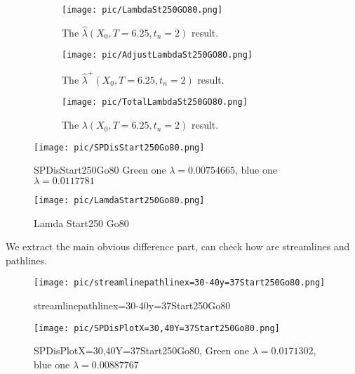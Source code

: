 \documentclass[
     11pt,         %
     a4paper,      %
     oneside,
     ]{article}
\begin{document}
\begin{figure}[H]
	\centering
	\begin{subfigure}{0.3\textwidth}
		\centering
		\texttt{[image: pic/LambdaSt250GO80.png]}
		\caption{The $\hat{\lambda}(X_{0}, T=6.25, t_{n}=2)$ result.}
	\end{subfigure}
	\begin{subfigure}{0.3\textwidth}
		\centering
		\texttt{[image: pic/AdjustLambdaSt250GO80.png]}
		\caption{ The $\hat{\lambda}^{+}(X_{0}, T=6.25, t_{n}=2)$ result.}
	\end{subfigure}
	\begin{subfigure}{0.3\textwidth}
		\centering
		\texttt{[image: pic/TotalLambdaSt250GO80.png]}
		\caption{ The $\lambda(X_{0}, T=6.25, t_{n}=2)$ result.}
	\end{subfigure}
	
	\caption{}
	\label{fig:lamadaResult2s}
\end{figure}

\begin{figure}[H]
	\centering
	\begin{minipage}{0.45\textwidth}
		\centering
		\texttt{[image: pic/SPDisStart250Go80.png]}
		\caption{{\tiny SPDisStart250Go80 Green one $\lambda=0.00754665$, blue one $\lambda=0.0117781$}}
		\label{fig:SPDisStart250Go80}
	\end{minipage}
	\begin{minipage}{0.45\textwidth}
		\centering
		\texttt{[image: pic/LamdaStart250Go80.png]}
		\caption{{\tiny Lamda Start250 Go80}}
		\label{fig:LamdaStart250Go80}
	\end{minipage}
	
\end{figure}

We extract the main obvious difference part, can check how are streamlines and pathlines. 



\begin{figure}[H]
	\centering
	\begin{minipage}{0.45\textwidth}
		\centering
		\texttt{[image: pic/streamlinepathlinex=30-40y=37Start250Go80.png]}
		\caption{\tiny streamlinepathlinex=30-40y=37Start250Go80 }
		\label{fig:streamlinepathlinex=30-40y=37Start250Go80}
	\end{minipage}
	\begin{minipage}{0.45\textwidth}
		\centering
		\texttt{[image: pic/SPDisPlotX=30,40Y=37Start250Go80.png]}
		\caption{\tiny SPDisPlotX=30,40Y=37Start250Go80, Green one $\lambda=0.0171302$, blue one $\lambda=0.00887767$}
		\label{fig:SPDisPlotX=30,40Y=37Start250Go80}
	\end{minipage}
	
\end{figure}
\end{document}
